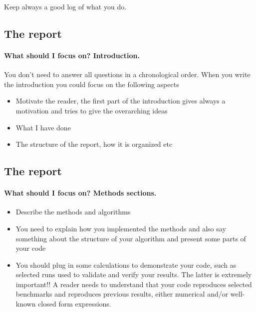 \documentclass[%
oneside,                 %
final,                   %
10pt]{article}
\begin{document}
\noindent
Keep always a good log of what you do.



\subsection*{The report}

\paragraph{What should I focus on? Introduction.}
You don't need to answer all questions in a chronological order.  When you write the introduction you could focus on the following aspects
\begin{itemize}
 \item Motivate the reader, the first part of the introduction gives always a motivation and tries to give the overarching ideas

 \item What I have done

 \item The structure of the report, how it is organized etc
\end{itemize}

\noindent




\subsection*{The report}

\paragraph{What should I focus on? Methods sections.}
\begin{itemize}
 \item Describe the methods and algorithms

 \item You need to explain how you implemented the methods and also say something about the structure of your algorithm and present some parts of your code

 \item You should plug in some calculations to demonstrate your code, such as selected runs used to validate and verify your results. The latter is extremely important!!  A reader needs to understand that your code reproduces selected benchmarks and reproduces previous results, either numerical and/or well-known  closed form expressions.
\end{itemize}
\end{document}
